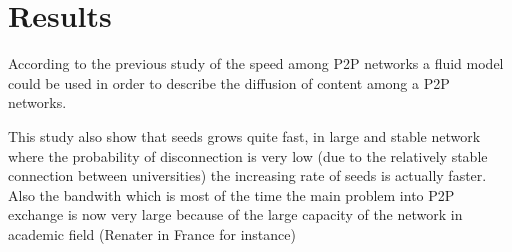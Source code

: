\section{Results}

According to the previous study of the speed among P2P networks
\cite{Qiu:2004:MPA:1030194.1015508} a fluid model could be used
in order to describe the diffusion of content among a P2P networks.

This study also show that seeds grows quite fast, in large and stable 
network where the probability of disconnection is very low (due to the relatively
stable connection between universities) the increasing rate of seeds is actually
faster. Also the bandwith which is most of the time the main problem into P2P exchange is
now very large because of the large capacity of the network in academic field (Renater in France 
for instance)


